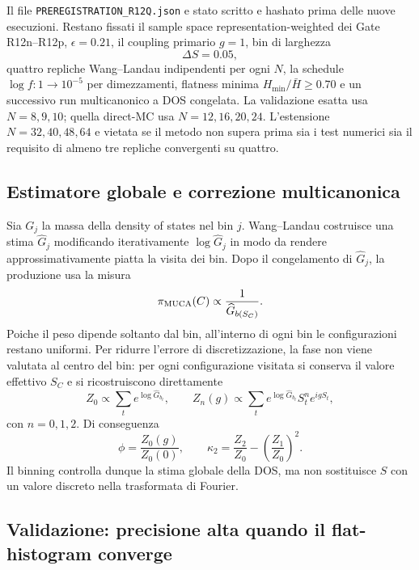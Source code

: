 \documentclass[11pt,a4paper]{article}
\begin{document}
Il file \texttt{PREREGISTRATION\_R12Q.json} e stato scritto e hashato prima delle nuove esecuzioni. Restano fissati il sample space representation-weighted dei Gate R12n--R12p, $\epsilon=0.21$, il coupling primario $g=1$, bin di larghezza
\begin{equation}
 \Delta S=0.05,
\end{equation}
quattro repliche Wang--Landau indipendenti per ogni $N$, la schedule $\log f:1\to10^{-5}$ per dimezzamenti, flatness minima $H_{\min}/\bar H\ge0.70$ e un successivo run multicanonico a DOS congelata. La validazione esatta usa $N=8,9,10$; quella direct-MC usa $N=12,16,20,24$. L'estensione $N=32,40,48,64$ e vietata se il metodo non supera prima sia i test numerici sia il requisito di almeno tre repliche convergenti su quattro.

\subsection{Estimatore globale e correzione multicanonica}

Sia $G_j$ la massa della density of states nel bin $j$. Wang--Landau costruisce una stima $\widehat G_j$ modificando iterativamente $\log\widehat G_j$ in modo da rendere approssimativamente piatta la visita dei bin. Dopo il congelamento di $\widehat G_j$, la produzione usa la misura
\begin{equation}
 \pi_{\rm MUCA}(C)\propto \frac{1}{\widehat G_{b(S_C)}}.
\end{equation}
Poiche il peso dipende soltanto dal bin, all'interno di ogni bin le configurazioni restano uniformi. Per ridurre l'errore di discretizzazione, la fase non viene valutata al centro del bin: per ogni configurazione visitata si conserva il valore effettivo $S_C$ e si ricostruiscono direttamente
\begin{equation}
 Z_0\propto\sum_t e^{\log\widehat G_{b_t}},\qquad
 Z_n(g)\propto\sum_t e^{\log\widehat G_{b_t}}S_t^n e^{igS_t},
\end{equation}
con $n=0,1,2$. Di conseguenza
\begin{equation}
 \phi=\frac{Z_0(g)}{Z_0(0)},\qquad
 \kappa_2=\frac{Z_2}{Z_0}-\left(\frac{Z_1}{Z_0}\right)^2.
\end{equation}
Il binning controlla dunque la stima globale della DOS, ma non sostituisce $S$ con un valore discreto nella trasformata di Fourier.

\subsection{Validazione: precisione alta quando il flat-histogram converge}
\end{document}
